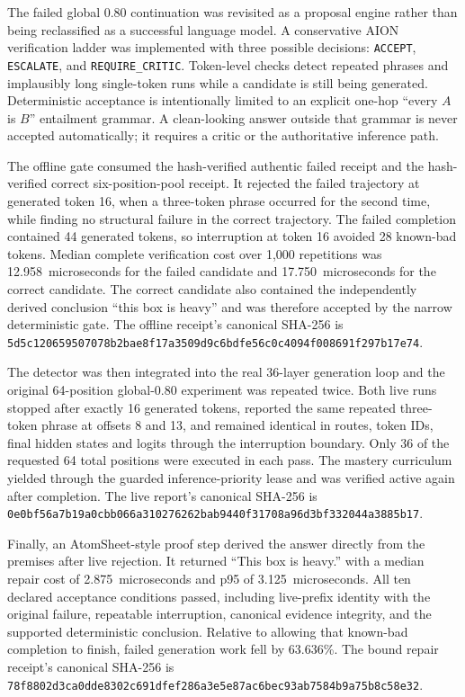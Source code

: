 The failed global 0.80 continuation was revisited as a proposal engine rather
than being reclassified as a successful language model.  A conservative AION
verification ladder was implemented with three possible decisions:
\texttt{ACCEPT}, \texttt{ESCALATE}, and \texttt{REQUIRE\_CRITIC}.  Token-level
checks detect repeated phrases and implausibly long single-token runs while a
candidate is still being generated.  Deterministic acceptance is intentionally
limited to an explicit one-hop ``every $A$ is $B$'' entailment grammar.  A
clean-looking answer outside that grammar is never accepted automatically; it
requires a critic or the authoritative inference path.

The offline gate consumed the hash-verified authentic failed receipt and the
hash-verified correct six-position-pool receipt.  It rejected the failed
trajectory at generated token 16, when a three-token phrase occurred for the
second time, while finding no structural failure in the correct trajectory.
The failed completion contained 44 generated tokens, so interruption at token
16 avoided 28 known-bad tokens.  Median complete verification cost over 1,000
repetitions was 12.958~microseconds for the failed candidate and
17.750~microseconds for the correct candidate.  The correct candidate also
contained the independently derived conclusion ``this box is heavy'' and was
therefore accepted by the narrow deterministic gate.  The offline receipt's
canonical SHA-256 is
\texttt{5d5c120659507078b2bae8f17a3509d9c6bdfe56c0c4094f008691f297b17e74}.

The detector was then integrated into the real 36-layer generation loop and
the original 64-position global-0.80 experiment was repeated twice.  Both live
runs stopped after exactly 16 generated tokens, reported the same repeated
three-token phrase at offsets 8 and 13, and remained identical in routes,
token IDs, final hidden states and logits through the interruption boundary.
Only 36 of the requested 64 total positions were executed in each pass.  The
mastery curriculum yielded through the guarded inference-priority lease and
was verified active again after completion.  The live report's canonical
SHA-256 is
\texttt{0e0bf56a7b19a0cbb066a310276262bab9440f31708a96d3bf332044a3885b17}.

Finally, an AtomSheet-style proof step derived the answer directly from the
premises after live rejection.  It returned ``This box is heavy.'' with a
median repair cost of 2.875~microseconds and p95 of 3.125~microseconds.  All ten
declared acceptance conditions passed, including live-prefix identity with the
original failure, repeatable interruption, canonical evidence integrity, and
the supported deterministic conclusion.  Relative to allowing that known-bad
completion to finish, failed generation work fell by 63.636\%.  The bound
repair receipt's canonical SHA-256 is
\texttt{78f8802d3ca0dde8302c691dfef286a3e5e87ac6bec93ab7584b9a75b8c58e32}.

